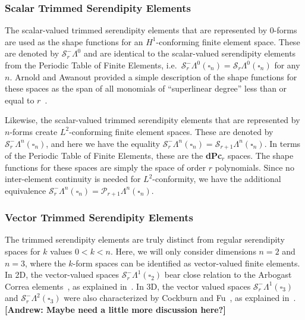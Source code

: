 \documentclass[manuscript,screen]{acmart}
\newcommand\akg[1]{\textbf{\textcolor[rgb]{.5,0,1}{[Andrew: #1]}}}
\newcommand{\calP}{\mathcal{P}}
\newcommand{\calS}{\mathcal{S}}
\begin{document}
  
  \subsubsection{Scalar Trimmed Serendipity Elements}
  The scalar-valued trimmed serendipity elements that are represented by $0$-forms are used as the shape functions for an $H^1$-conforming finite element space.  These are denoted by $\calS_r^-\Lambda^0$ and are identical to the scalar-valued serendipity elements from the Periodic Table of Finite Elements, i.e.\ $\calS_r^-\Lambda^0(\square_n) = \calS_r\Lambda^0(\square_n)$ for any $n$.  Arnold and Awanout provided a simple description of the shape functions for these spaces as the span of all monomials of ``superlinear degree'' less than or equal to $r$~\cite{arnold2011serendipity}. 
  
  Likewise, the scalar-valued trimmed serendipity elements that are represented by $n$-forms create $L^2$-conforming finite element spaces.  These are denoted by $\calS_r^-\Lambda^n(\square_n)$, and here we have the equality $\calS_r^-\Lambda^n(\square_n) = \calS_{r+1}\Lambda^n(\square_n)$.  In terms of the Periodic Table of Finite Elements, these are the \textbf{dPc}$_r$ spaces.  The shape functions for these spaces are simply the space of order $r$ polynomials.  Since no inter-element continuity is needed for $L^2$-conformity, we have the additional equivalence $\calS_r^-\Lambda^n(\square_n) = \calP_{r+1}\Lambda^n(\square_n)$.
  
  \subsubsection{Vector Trimmed Serendipity Elements}
  

	The trimmed serendipity elements are truly distinct from regular serendipity spaces for $k$ values $0<k<n$.  Here, we will only consider dimensions $n=2$ and $n=3$, where the $k$-form spaces can be identified as vector-valued finite elements.  
	In 2D, the vector-valued spaces $\calS_r^-\Lambda^1(\square_2)$ bear close relation to the Arbogast Correa elements~\cite{arbogast2016two}, as explained in~\cite[Prop 2.2]{gillette2019trimmed}.
	In 3D, the vector valued spaces $\calS_r^-\Lambda^1(\square_3)$ and $\calS_r^-\Lambda^2(\square_3)$ were also characterized by Cockburn and Fu~\cite{CF2016}, as explained in~\cite[Prop 2.3]{gillette2019trimmed}.
	\akg{Maybe need a little more discussion here?}
	
\end{document}
